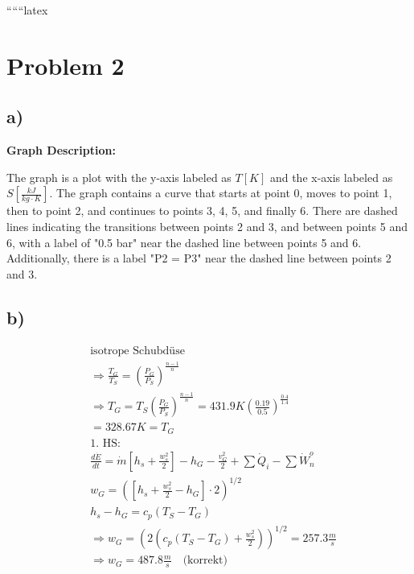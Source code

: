 
``````latex


\section*{Problem 2}

\subsection*{a)}

\begin{center}
\textbf{Graph Description:}

The graph is a plot with the y-axis labeled as \( T [K] \) and the x-axis labeled as \( S \left[ \frac{kJ}{kg \cdot K} \right] \). The graph contains a curve that starts at point 0, moves to point 1, then to point 2, and continues to points 3, 4, 5, and finally 6. There are dashed lines indicating the transitions between points 2 and 3, and between points 5 and 6, with a label of "0.5 bar" near the dashed line between points 5 and 6. Additionally, there is a label "P2 = P3" near the dashed line between points 2 and 3.
\end{center}

\subsection*{b)}

\begin{align*}
&\text{isotrope Schubdüse} \\
&\Rightarrow \frac{T_G}{T_S} = \left( \frac{P_G}{P_S} \right)^{\frac{n-1}{n}} \\
&\Rightarrow T_G = T_S \left( \frac{P_G}{P_S} \right)^{\frac{n-1}{n}} = 431.9K \left( \frac{0.19}{0.5} \right)^{\frac{0.4}{1.4}} \\
&= 328.67K = T_G \\
&\text{1. HS:} \\
&\frac{d\dot{E}}{dt} = \dot{m} \left[ h_s + \frac{w_s^2}{2} \right] - h_G - \frac{v_G^2}{2} + \sum \dot{Q}_i - \sum \dot{W}_n^o \\
&w_G = \left( \left[ h_s + \frac{w_s^2}{2} - h_G \right] \cdot 2 \right)^{1/2} \\
&h_s - h_G = c_p (T_S - T_G) \\
&\Rightarrow w_G = \left( 2 \left( c_p (T_S - T_G) + \frac{w_s^2}{2} \right) \right)^{1/2} = 257.3 \frac{m}{s} \\
&\Rightarrow w_G = 487.8 \frac{m}{s} \quad \text{(korrekt)} \\
\end{align*}

